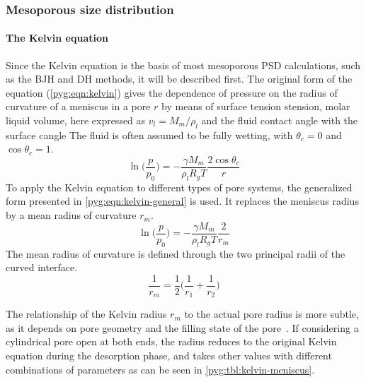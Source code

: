 \subsubsection{Mesoporous size distribution}

\paragraph{The Kelvin equation}

Since the Kelvin equation is the basis of most mesoporous PSD
calculations, such as the \gls{BJH} and \gls{DH} methods, it will be described
first. The original form of the equation (\autoref{pyg:eqn:kelvin})
gives the dependence of pressure on the radius of curvature of a
meniscus in a pore \(r\) by means of surface tension \gls{stension},
molar liquid volume, here expressed as \(v_l=M_m/\rho_l\) and the
fluid contact angle with the surface \gls{cangle}
The fluid is often assumed to be fully wetting, with
\(\theta_c=0\) and \(\cos\theta_c=1\).
%
\begin{equation}\label{pyg:eqn:kelvin}
	\ln\Big(\frac{p}{p_0}\Big) = -\frac{\gamma M_m}{\rho_l R_gT}\frac{2 \cos\theta_c}{r}
\end{equation}
%
To apply the Kelvin equation to different types of pore systems, the
generalized form presented in \autoref{pyg:eqn:kelvin-general}
is used. It replaces the meniscus radius by a mean radius of curvature
\(r_m\).
%
\begin{equation}\label{pyg:eqn:kelvin-general}
	\ln\Big(\frac{p}{p_0}\Big) = -\frac{\gamma M_m}{\rho_l R_gT}\frac{2}{r_m}
\end{equation}
%
The mean radius of curvature is defined through the two principal
radii of the curved interface.
%
\begin{equation}\label{pyg:eqn:kelvin-mradius}
	\frac{1}{r_m} = \frac{1}{2}\Big(\frac{1}{r_1}+\frac{1}{r_2}\Big)
\end{equation}

The relationship of the Kelvin radius \(r_m\) to the actual pore
radius is more subtle, as it depends on pore geometry and the
filling state of the pore~\cite{doAdsorptionAnalysisEquilibria1998}.
If considering a cylindrical pore open at both ends, the radius reduces
to the original Kelvin equation during the desorption phase, and takes
other values with different combinations of parameters
as can be seen in \autoref{pyg:tbl:kelvin-meniscus}.

